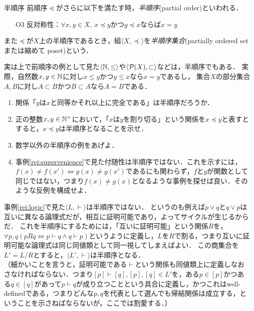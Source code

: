 \documentclass[dvipdfmx,11pt,a4paper]{jsarticle}
\begin{document}
\begin{dfn}{半順序}{}
前順序$\preceq$がさらに以下を満たす時，\emph{半順序}(partial order)といわれる．
\begin{itemize}
 \item[O3] 反対称性：$\forall x, y \in X, \ x \preceq y$かつ$y \preceq x$ならば$x = y$
\end{itemize}
また$\preceq$が$X$上の半順序であるとき，組$\langle X, \preceq \rangle$を\emph{半順序集合}(partially ordered set または縮めて poset)という．
\end{dfn}

実は上で前順序の例として見た$\langle \mathbb{N}, \leq \rangle$や$\langle \mathcal{P}(X), \subset \rangle$などは，半順序でもある．
実際，自然数$x, y \in \mathbb{N}$に対し$x \leq y$かつ$y \leq x$なら$x=y$であるし，
集合$X$の部分集合$A, B$に対し$A \subset B$かつ$B \subset A$なら$A=B$である．

\begin{renshu}{}{}
\begin{enumerate}
 \item 関係「$y$は$x$と同等かそれ以上に完全である」は半順序だろうか．
 \item 正の整数$x, y \in \mathbb{N}^+$において，「$x$は$y$を割り切る」という関係を$x \preceq y$と表すとすると，$x \preceq y$は半順序となることを示せ．
 \item 数学以外の半順序の例をあげよ．
 \item 事例\ref{rei:supervenience}で見た付随性は半順序ではない．これを示すには，$f(x) \neq f(x') \iff g(x) \neq g(x')$であるにも関わらず，$f$と$g$が関数として同じではない，つまり$f(x) \neq g(x)$となるような事例を探せば良い．そのような反例を構成せよ．
\end{enumerate}
\end{renshu}

事例\ref{rei:logic}で見た$\langle L, \vdash \rangle$は半順序ではない．
というのも例えば$p \vee q$と$q \vee p$は互いに異なる論理式だが，相互に証明可能であり，よってサイクルが生じるからだ．
これを半順序にするためには，「互いに証明可能」という関係$R$を，$\forall p, q (pRq \iff p \vdash q \wedge q \vdash p)$というように定義し，$L$を$R$で割る，つまり互いに証明可能な論理式は同じ同値類として同一視してしまえばよい．
この商集合を$L' = L/R$とすると，$\langle L', \vdash \rangle$は半順序となる．\\
（細かいことを言うと，証明可能である$\vdash$という関係も同値類上に定義しなおさなければならない．つまり$[p]\vdash[q], [p], [q] \in L'$を，ある$p \in [p]$かつある$q \in [q]$があって$p \vdash q$が成り立つことという具合に定義し，かつこれはwell-definedである，つまりどんな$p, q$を代表として選んでも帰結関係は成立する，ということを示さねばならないが，ここでは割愛する．）
\end{document}
